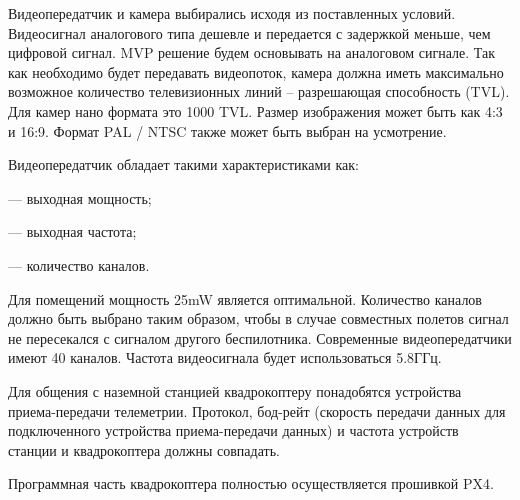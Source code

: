 Видеопередатчик и камера выбирались исходя из поставленных условий. Видеосигнал аналогового типа дешевле и передается с задержкой меньше, чем цифровой сигнал. MVP решение будем основывать на аналоговом сигнале. Так как необходимо будет передавать видеопоток, камера должна иметь максимально возможное количество телевизионных линий -- разрешающая способность (TVL). Для камер нано формата это 1000 TVL. Размер изображения может быть как 4:3 и 16:9. Формат PAL / NTSC также может быть выбран на усмотрение.

Видеопередатчик обладает такими характеристиками как:

--- выходная мощность;

--- выходная частота;

--- количество каналов.

Для помещений мощность 25mW является оптимальной. Количество каналов должно быть выбрано таким образом, чтобы в случае совместных полетов сигнал не пересекался с сигналом другого беспилотника. Современные видеопередатчики имеют 40 каналов. Частота видеосигнала будет использоваться 5.8ГГц.

Для общения с наземной станцией квадрокоптеру понадобятся устройства приема-передачи телеметрии. Протокол, бод-рейт (скорость передачи данных для подключенного устройства приема-передачи данных) и частота устройств станции и квадрокоптера должны совпадать.

Программная часть квадрокоптера полностью осуществляется прошивкой PX4.

